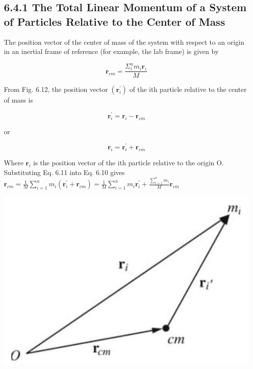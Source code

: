 \documentclass[10pt]{article}
\begin{document}
\subsection*{6.4.1 The Total Linear Momentum of a System of Particles Relative to the Center of Mass}
The position vector of the center of mass of the system with respect to an origin in an inertial frame of reference (for example, the lab frame) is given by


\begin{equation*}
\mathbf{r}_{c m}=\frac{\Sigma_{i}^{n} m_{i} \mathbf{r}_{i}}{M} \tag{6.10}
\end{equation*}


From Fig. 6.12, the position vector $\left(\mathbf{r}_{i}^{\prime}\right)$ of the ith particle relative to the center of mass is

$$
\mathbf{r}_{i}^{\prime}=\mathbf{r}_{i}-\mathbf{r}_{c m}
$$

or


\begin{equation*}
\mathbf{r}_{i}=\mathbf{r}_{i}^{\prime}+\mathbf{r}_{c m} \tag{6.11}
\end{equation*}


Where $\mathbf{r}_{i}$ is the position vector of the ith particle relative to the origin O. Substituting Eq. 6.11 into Eq. 6.10 gives\\
$\mathbf{r}_{c m}=\frac{1}{M} \sum_{i=1}^{n} m_{i}\left(\mathbf{r}_{i}^{\prime}+\mathbf{r}_{c m}\right)=\frac{1}{M} \sum_{i=1}^{n} m_{i} \mathbf{r}_{i}^{\prime}+\frac{\sum_{i=1}^{n} m_{i}}{M} \mathbf{r}_{c m}$

\begin{center}
\includegraphics[max width=\textwidth]{2024_09_13_db1f357d2aad0a03eb2eg-104}
\end{center}
\end{document}
